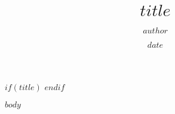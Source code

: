 \documentclass[ignorenonframetext,]{beamer}
\title{$title$}
\author{$author$}
\date{$date$}
\begin{document}
$if(title)$
\frame{\titlepage}
$endif$

$body$
\end{document}

